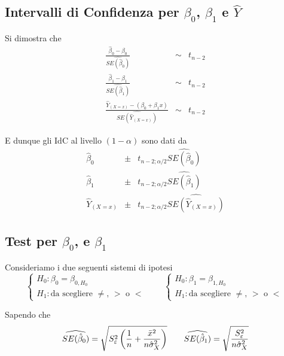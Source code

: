 \documentclass[
  11pt,
]{book}
\theoremstyle{mytheoremstyle}
\theoremstyle{mydefstyle}
\begin{document}
\subsection{\texorpdfstring{Intervalli di Confidenza per \(\beta_0\), \(\beta_1\) e \(\hat Y\)}{Intervalli di Confidenza per \textbackslash beta\_0, \textbackslash beta\_1 e \textbackslash hat Y}}\label{intervalli-di-confidenza-per-beta_0-beta_1-e-hat-y}

Si dimostra che
\begin{eqnarray*}
 \frac{\hat\beta_0-\beta_0}{\widehat{SE(\hat\beta_0)}}&\sim&t_{n-2}\\
 \frac{\hat\beta_1-\beta_1}{\widehat{SE(\hat\beta_1)}}&\sim&t_{n-2}\\
 \frac{\hat Y_{(X=x)}-(\beta_0+\beta_1 x)}{\widehat{SE(\hat Y_{(X=x)})}}&\sim&t_{n-2}
\end{eqnarray*}

E dunque gli IdC al livello \((1-\alpha)\) sono dati da
\begin{eqnarray*}
\hat\beta_0 &\pm& t_{n-2;\alpha/2}\widehat{SE(\hat\beta_0)}\\
\hat\beta_1 &\pm& t_{n-2;\alpha/2}\widehat{SE(\hat\beta_1)}\\
\hat Y_{(X=x)} &\pm& t_{n-2;\alpha/2}\widehat{SE(\hat Y_{(X=x)})}
\end{eqnarray*}

\subsection{\texorpdfstring{Test per \(\beta_0\), e \(\beta_1\)}{Test per \textbackslash beta\_0, e \textbackslash beta\_1}}\label{test-per-beta_0-e-beta_1}

Consideriamo i due seguenti sistemi di ipotesi
\[
\begin{cases}
H_0:\beta_0=\beta_{0,H_0}\\H_1:\text{da scegliere $\neq$, $>$ o $<$}
\end{cases}
\qquad
\begin{cases}
H_0:\beta_1=\beta_{1,H_0}\\H_1:\text{da scegliere $\neq$, $>$ o $<$}
\end{cases}
\]

Sapendo che
\[
\widehat{SE(\hat\beta_{0})}           = \sqrt{S_{\varepsilon}^{2}\left( \frac{1} {n} + \frac{\bar{x}^{2}} {n\hat{\sigma}^{2}_{X}} \right)} \qquad \widehat{SE(\hat\beta_{1})}           = \sqrt{\frac{S_{\varepsilon}^{2}} {n\hat{\sigma}^{2}_{X}} }\\
\]
\end{document}
